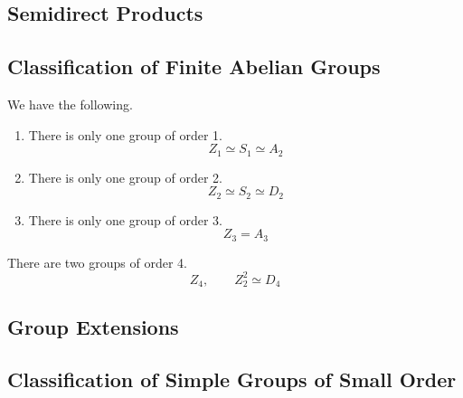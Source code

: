 \subsection{Semidirect Products} 

\subsection{Classification of Finite Abelian Groups} 

  \begin{theorem}
    We have the following. 
    \begin{enumerate}
      \item There is only one group of order 1. 
        \begin{equation}
          Z_1 \simeq S_1 \simeq A_2
        \end{equation}

      \item There is only one group of order 2. 
        \begin{equation}
          Z_2 \simeq S_2 \simeq D_2
        \end{equation}

      \item There is only one group of order 3. 
        \begin{equation}
          Z_3 = A_3
        \end{equation}
    \end{enumerate}
  \end{theorem}

  \begin{theorem}
    There are two groups of order 4. 
    \begin{equation}
      Z_4, \qquad Z_2^2 \simeq D_4
    \end{equation}
  \end{theorem}

\subsection{Group Extensions}

\subsection{Classification of Simple Groups of Small Order}

